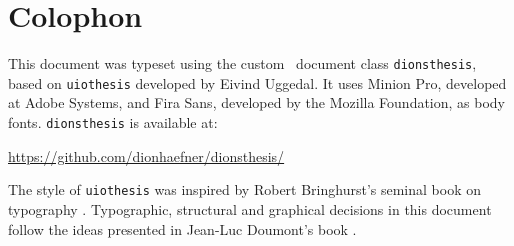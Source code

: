 \null
\vfill


\section*{Colophon}
This document was typeset using the custom \LaTeXe\ document class \texttt{dionsthesis}, based on \texttt{uiothesis} developed by Eivind Uggedal. It uses Minion Pro, developed at Adobe Systems, and Fira Sans, developed by the Mozilla Foundation, as body fonts.
\texttt{dionsthesis} is available at: 
\begin{center}
\url{https://github.com/dionhaefner/dionsthesis/}
\end{center}
%
The style of \texttt{uiothesis} was inspired by Robert Bringhurst's seminal book on typography . Typographic, structural and graphical decisions in this document follow the ideas presented in Jean-Luc Doumont's book .